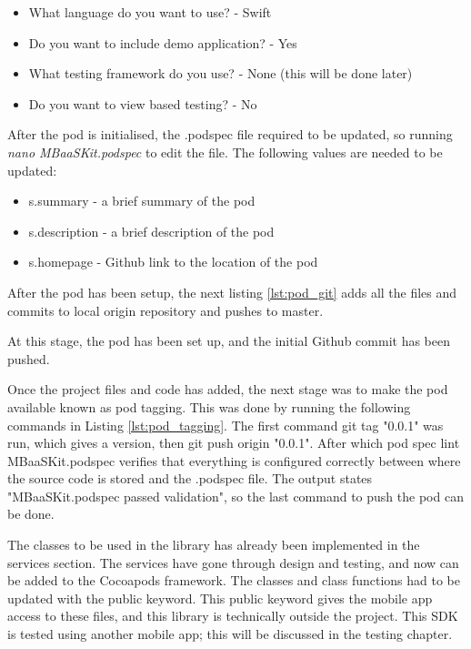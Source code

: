 

\begin{itemize}
  \item What language do you want to use?
  - Swift
  \item Do you want to include demo application?
  - Yes
  \item What testing framework do you use?
  - None (this will be done later)
  \item Do you want to view based testing?
  - No
\end{itemize}

After the pod is initialised, the .podspec file required to be updated, so running \textit{nano MBaaSKit.podspec} to edit the file. The following values are needed to be updated: 

\begin{itemize}
  \item s.summary
  - a brief summary of the pod
  \item s.description
  - a brief description of the pod
  \item s.homepage
  - Github link to the location of the pod
\end{itemize}

After the pod has been setup, the next listing \ref{lst:pod_git} adds all the files and commits to local origin repository and pushes to master.



At this stage, the pod has been set up, and the initial Github commit has been pushed. 

Once the project files and code has added, the next stage was to make the pod available known as pod tagging. This was done by running the following commands in Listing \ref{lst:pod_tagging}. The first command git tag "0.0.1" was run, which gives a version, then git push origin "0.0.1". After which pod spec lint MBaaSKit.podspec verifies that everything is configured correctly between where the source code is stored and the .podspec file. The output states "MBaaSKit.podspec passed validation", so the last command to push the pod can be done. 



The classes to be used in the library has already been implemented in the services section. The services have gone through design and testing, and now can be added to the Cocoapods framework. The classes and class functions had to be updated with the public keyword. This public keyword gives the mobile app access to these files, and this library is technically outside the project. This SDK is tested using another mobile app; this will be discussed in the testing chapter.

